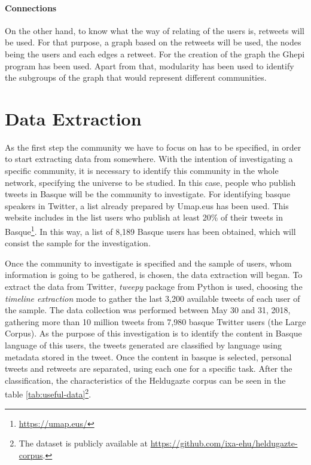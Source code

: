 \documentclass[information,article,submit,moreauthors,pdftex,10pt,a4paper]{Definitions/mdpi}
\begin{document}
\paragraph{Connections}

On the other hand, to know what the way of relating of the users is, retweets will be used. For that purpose, a graph based on the retweets will be used, the nodes being the users and each edges a retweet. For the creation of the graph the Ghepi program \citep{bastian2009gephi} has been used. Apart from that, modularity \citep{blondel2008fast} has been used to identify the subgroups of the graph that would represent different communities.



\section{Data Extraction}\label{sec:data-extraction}

As the first step the community we have to focus on has to be specified, in order to start extracting data from somewhere. With the intention of investigating a specific community, it is necessary to identify this community in the whole network, specifying the universe to be studied. In this case, people who publish tweets in Basque will be the community to investigate. For identifying basque speakers in Twitter, a list already prepared by Umap.eus has been used. This website includes in the list users who publish at least 20\% of their tweets in Basque\footnote{\url{https://umap.eus/}}. In this way, a list of 8,189 Basque users has been obtained, which will consist the sample for the investigation.

Once the community to investigate is specified and the sample of users, whom information is going to be gathered, is chosen, the data extraction will began. To extract the data from Twitter, \textit{tweepy} package from Python is used, choosing the \textit{timeline extraction} mode to gather the last 3,200 available tweets of each user of the sample. The data collection was performed between May 30 and 31, 2018, gathering more than 10 million tweets from 7,980 basque Twitter users (the Large Corpus). As the purpose of this investigation is to identify the content in Basque language of this users, the tweets generated are classified by language using metadata stored in the tweet. Once the content in basque is selected, personal tweets and retweets are separated, using each one for a specific task. After the classification, the characteristics of the Heldugazte corpus can be seen in the table \ref{tab:useful-data}\footnote{The dataset is publicly available at \url{https://github.com/ixa-ehu/heldugazte-corpus}.}.
\end{document}
